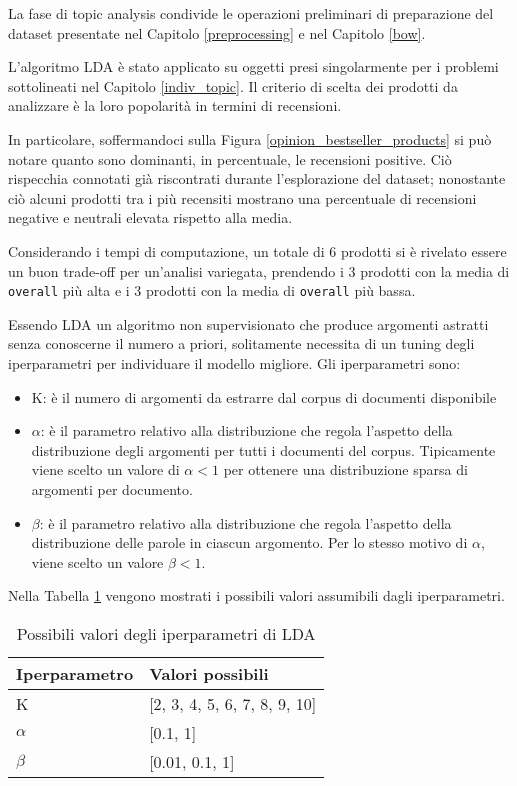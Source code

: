 La fase di topic analysis condivide le operazioni preliminari di preparazione del dataset presentate nel Capitolo \ref{preprocessing} e nel Capitolo \ref{bow}.
\par
L'algoritmo LDA è stato applicato su oggetti presi singolarmente per i problemi sottolineati nel Capitolo \ref{indiv_topic}. Il criterio di scelta dei prodotti da analizzare è la loro popolarità in termini di recensioni.
\par 
In particolare, soffermandoci sulla Figura \ref{opinion_bestseller_products} si può notare quanto sono dominanti, in percentuale, le recensioni positive. Ciò rispecchia connotati già riscontrati durante l'esplorazione del dataset; nonostante ciò alcuni prodotti tra i più recensiti mostrano una percentuale di recensioni negative e neutrali elevata rispetto alla media.
\par 
Considerando i tempi di computazione, un totale di 6 prodotti si è rivelato essere un buon trade-off per un'analisi variegata, prendendo i 3 prodotti con la media di \texttt{overall} più alta e i 3 prodotti con la media di \texttt{overall} più bassa.
\par
Essendo LDA un algoritmo non supervisionato che produce argomenti astratti senza conoscerne il numero a priori, solitamente necessita di un tuning degli iperparametri per individuare il modello migliore. Gli iperparametri sono:

\begin{itemize}
    \item K: è il numero di argomenti da estrarre dal corpus di documenti disponibile
    \item $\alpha$: è il parametro relativo alla distribuzione che regola l’aspetto della distribuzione degli argomenti per tutti i documenti del corpus. Tipicamente viene scelto un valore di $\alpha < 1$ per ottenere una distribuzione sparsa di argomenti per documento.
    \item $\beta$: è il parametro relativo alla distribuzione che regola l’aspetto della distribuzione delle parole in ciascun argomento. Per lo stesso motivo di $\alpha$, viene scelto un valore $\beta < 1$.
\end{itemize}{}

Nella Tabella \ref{values_hyper} vengono mostrati i possibili valori assumibili dagli iperparametri.
\begin{table}[H]
\small  
\centering
\begin{tabular}{|p{}|p{}|}
\hline
Iperparametro & Valori possibili\\
\hline
K & [2, 3, 4, 5, 6, 7, 8, 9, 10]\\
$\alpha$ & [0.1, 1]\\
$\beta$ & [0.01, 0.1, 1]\\
\hline
\end{tabular}
\caption{Possibili valori degli iperparametri di LDA}
\label{values_hyper}
\end{table}

